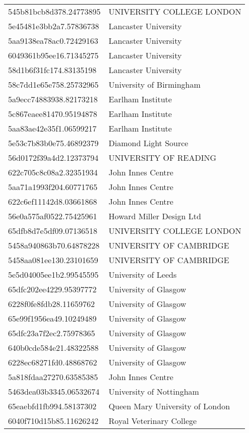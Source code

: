 \begin{tabular}{ll}
545b81bcb8d378.24773895 & UNIVERSITY COLLEGE LONDON \\
5e45481e3bb2a7.57836738 & Lancaster University \\
5aa9138ea78ac0.72429163 & Lancaster University \\
6049361b95ee16.71345275 & Lancaster University \\
58d1b6f31fc174.83135198 & Lancaster University \\
58c7dd1e65e758.25732965 & University of Birmingham \\
5a9ecc74883938.82173218 & Earlham Institute \\
5c867eaee81470.95194878 & Earlham Institute \\
5aa83ae42e35f1.06599217 & Earlham Institute \\
5e53c7b83b0e75.46892379 & Diamond Light Source \\
56d0172f39a4d2.12373794 & UNIVERSITY OF READING \\
622c705c8c08a2.32351934 & John Innes Centre \\
5aa71a1993f204.60771765 & John Innes Centre \\
622c6ef11142d8.03661868 & John Innes Centre \\
56e0a575af0522.75425961 & Howard Miller Design Ltd \\
65dfb8d7e5df09.07136518 & UNIVERSITY COLLEGE LONDON \\
5458a940863b70.64878228 & UNIVERSITY OF CAMBRIDGE \\
5458aa081ee130.23101659 & UNIVERSITY OF CAMBRIDGE \\
5e5d04005ee1b2.99545595 & University of Leeds \\
65dfc202ee4229.95397772 & University of Glasgow \\
6228f0fe8fdb28.11659762 & University of Glasgow \\
65e99f1956ea49.10249489 & University of Glasgow \\
65dfc23a7f2ec2.75978365 & University of Glasgow \\
640b0cde584e21.48322588 & University of Glasgow \\
6228ec68271fd0.48868762 & University of Glasgow \\
5a818fdaa27270.63585385 & John Innes Centre \\
5463dea03b3345.06532674 & University of Nottingham \\
65eaebfd1fb994.58137302 & Queen Mary University of London \\
6040f710d15b85.11626242 & Royal Veterinary College \\

\end{tabular}
